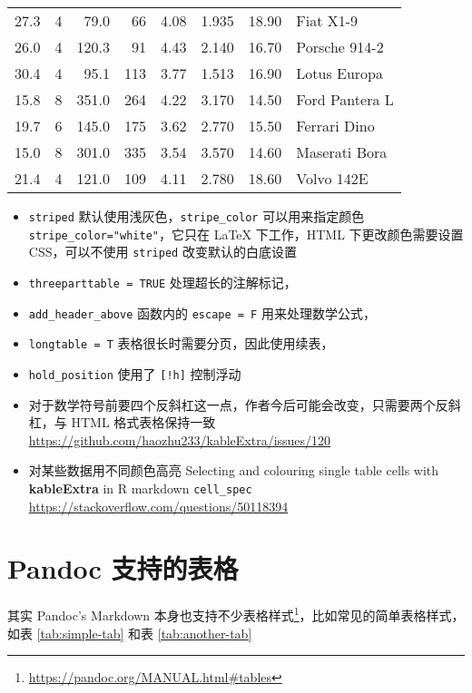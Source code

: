 \documentclass[
]{ctexbook}
\providecommand{\tightlist}{%
  \setlength{\itemsep}{0pt}\setlength{\parskip}{0pt}}
\begin{document}
\begin{ThreePartTable}
\begin{longtable}[t]{rrrrrrrl}
27.3 & 4 & 79.0 & 66 & 4.08 & 1.935 & 18.90 & Fiat X1-9\\
26.0 & 4 & 120.3 & 91 & 4.43 & 2.140 & 16.70 & Porsche 914-2\\
30.4 & 4 & 95.1 & 113 & 3.77 & 1.513 & 16.90 & Lotus Europa\\
15.8 & 8 & 351.0 & 264 & 4.22 & 3.170 & 14.50 & Ford Pantera L\\
19.7 & 6 & 145.0 & 175 & 3.62 & 2.770 & 15.50 & Ferrari Dino\\
\midrule
15.0 & 8 & 301.0 & 335 & 3.54 & 3.570 & 14.60 & Maserati Bora\\
21.4 & 4 & 121.0 & 109 & 4.11 & 2.780 & 18.60 & Volvo 142E\\*
\end{longtable}
\end{ThreePartTable}

\begin{itemize}
\tightlist
\item
  \texttt{striped} 默认使用浅灰色，\texttt{stripe\_color} 可以用来指定颜色 \texttt{stripe\_color="white"}，它只在 LaTeX 下工作，HTML 下更改颜色需要设置 CSS，可以不使用 \texttt{striped} 改变默认的白底设置\\
\item
  \texttt{threeparttable\ =\ TRUE} 处理超长的注解标记，
\item
  \texttt{add\_header\_above} 函数内的 \texttt{escape\ =\ F} 用来处理数学公式，
\item
  \texttt{longtable\ =\ T} 表格很长时需要分页，因此使用续表，
\item
  \texttt{hold\_position} 使用了 \texttt{{[}!h{]}} 控制浮动
\item
  对于数学符号前要四个反斜杠这一点，作者今后可能会改变，只需要两个反斜杠，与 HTML 格式表格保持一致 \url{https://github.com/haozhu233/kableExtra/issues/120}
\item
  对某些数据用不同颜色高亮
  Selecting and colouring single table cells with \textbf{kableExtra} in R markdown \texttt{cell\_spec} \url{https://stackoverflow.com/questions/50118394}
\end{itemize}

\hypertarget{pandoc-table}{%
\section{Pandoc 支持的表格}\label{pandoc-table}}

其实 Pandoc's Markdown 本身也支持不少表格样式\footnote{\url{https://pandoc.org/MANUAL.html\#tables}}，比如常见的简单表格样式，如表 \ref{tab:simple-tab} 和表 \ref{tab:another-tab}
\end{document}
